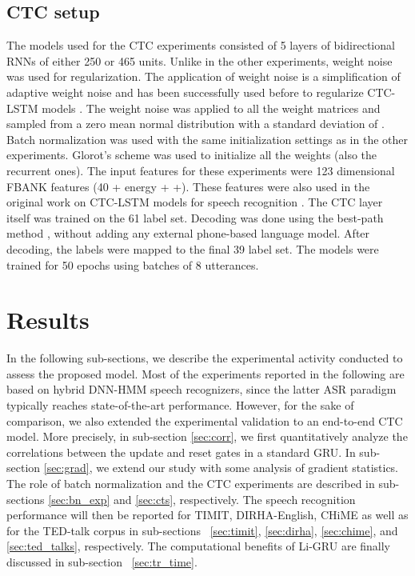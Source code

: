 \documentclass[journal]{IEEEtran}
\begin{document}
\subsection{CTC setup} \label{sec:ctc_setup}
The models used for the CTC experiments consisted of 5 layers of bidirectional RNNs of either 250 or 465 units. Unlike in the other experiments, weight noise was used for regularization. The application of weight noise is a simplification of adaptive weight noise \cite{graves2011practical} and has been successfully used before to regularize CTC-LSTM models \cite{graves2013speech}. The weight noise was applied to all the weight matrices and sampled from a zero mean normal distribution with a standard deviation of . Batch normalization was used with the same initialization settings as in the other experiments. Glorot's scheme was used to initialize all the weights (also the recurrent ones). The input features for these experiments were 123 dimensional FBANK features (40 + energy + +). These features were also used in the original work on CTC-LSTM models for speech recognition \cite{graves2013speech}.
The CTC layer itself was trained on the 61 label set. Decoding was done using the best-path method \cite{CTC_graves}, without adding any external phone-based language model.
After decoding, the labels were mapped to the final 39 label set. The models were trained for 50 epochs using batches of 8 utterances. 



\section{Results} \label{sec:res}
In the following sub-sections, we describe the experimental activity conducted to assess the proposed model. Most of the experiments reported in the following are based on hybrid DNN-HMM speech recognizers, since the latter ASR paradigm typically reaches state-of-the-art performance. However, for the sake of comparison, we also extended the experimental validation to an end-to-end CTC model.
More precisely, in sub-section \ref{sec:corr}, we first  quantitatively analyze the correlations between the update and reset gates in a standard GRU. In sub-section \ref{sec:grad}, we extend our study with some analysis of gradient statistics. The role of batch normalization and the CTC experiments are described in sub-sections \ref{sec:bn_exp} and \ref{sec:cts}, respectively. The speech recognition performance will then be reported for TIMIT,  DIRHA-English, CHiME as well as for the TED-talk corpus in  sub-sections ~\ref{sec:timit}, \ref{sec:dirha}, \ref{sec:chime}, and \ref{sec:ted_talks}, respectively. The computational benefits of Li-GRU are finally discussed in sub-section ~\ref{sec:tr_time}. 
\end{document}
